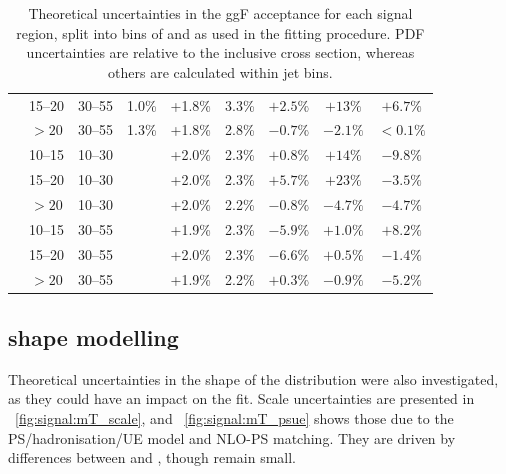 \begin{table}
\begin{tabular}{ccc|cccccc}
		& 15--20 & 30--55 & 1.0\% & +1.8\% & 3.3\% & $+2.5\%$ & $+13\%$  & $+6.7\%$  \\
		&  $>20$ & 30--55 & 1.3\% & +1.8\% & 2.8\% & $-0.7\%$ & $-2.1\%$ & $<0.1\%$ \\
		\hline
		\multirow{6}{*}{\twojet}
	    & 10--15 & 10--30 &       & +2.0\% & 2.3\% & $+0.8\%$ & $+14\%$  & $-9.8\%$ \\
		& 15--20 & 10--30 &       & +2.0\% & 2.3\% & $+5.7\%$ & $+23\%$  & $-3.5\%$  \\
		&  $>20$ & 10--30 &       & +2.0\% & 2.2\% & $-0.8\%$ & $-4.7\%$ & $-4.7\%$ \\
		& 10--15 & 30--55 &       & +1.9\% & 2.3\% & $-5.9\%$ & $+1.0\%$ & $+8.2\%$ \\
		& 15--20 & 30--55 &       & +2.0\% & 2.3\% & $-6.6\%$ & $+0.5\%$ & $-1.4\%$ \\
		&  $>20$ & 30--55 &       & +1.9\% & 2.2\% & $+0.3\%$ & $-0.9\%$ & $-5.2\%$ \\
	\end{tabular}
	\caption{Theoretical uncertainties in the ggF acceptance for each signal region, 
	split into bins of \ptsubleadlep and \mll as used in the fitting procedure. PDF 
	uncertainties are relative to the inclusive cross section, whereas others are 
	calculated within jet bins.}
	\label{tab:signal:acc_unc_binned}
\end{table}



\subsection{\mt shape modelling}

Theoretical uncertainties in the shape of the \mt distribution were also investigated, 
as they could have an impact on the fit. Scale uncertainties are presented in 
\Figure~\ref{fig:signal:mT_scale}, and \Figure~\ref{fig:signal:mT_psue} shows those due 
to the PS/hadronisation/UE model and NLO-PS matching. They are driven by differences 
between  and \fherwig, though remain small.

